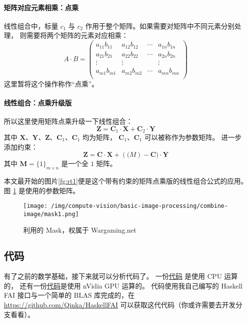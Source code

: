 \paragraph{矩阵对应元素相乘：点乘}
线性组合中，标量 $c_1$ 与 $c_2$ 作用于整个矩阵。如果需要对矩阵中不同元素分别处理，
则需要将两个矩阵的元素对应相乘：
\[
    A \cdot B = \left( \begin{array}{cccc}
        a_{11} b_{11} & a_{12} b_{12} & \cdots & a_{1n} b_{1n} \\
        a_{21} b_{21} & a_{22} b_{22} & \cdots & a_{2n} b_{2n} \\
        \vdots          & \vdots          &        & \vdots          \\
        a_{m1} b_{m1} & a_{m2} b_{m2} & \cdots & a_{mn} b_{mn} \\
    \end{array} \right)
\]
这里暂将这个操作称作“点乘”。

\paragraph{线性组合：点乘升级版}
所以这里使用矩阵点乘升级一下线性组合：
\[
    \mathbf{Z} = \mathbf{C}_1 \cdot \mathbf{X} + \mathbf{C}_2 \cdot \mathbf{Y}
\]
其中  $\mathbf{X}$、$\mathbf{Y}$、$\mathbf{Z}$、$\mathbf{C}_1$、$\mathbf{C}_1$ 均为矩阵，
$\mathbf{C}_1$、$\mathbf{C}_1$ 可以被称作为参数矩阵。
进一步添加约束：
\[
    \mathbf{Z} = \mathbf{C} \cdot \mathbf{X} + (\mathbf(M) - \mathbf{C}) \cdot \mathbf{Y}
\]
其中 $\mathbf{M} = \{1\}_{m \times n}$ 是一个全 $1$ 矩阵。

本文最开始的图片\ref{fg:rt1}便是这个带有约束的矩阵点乘版的线性组合公式的应用。
图 \ref{fg:mask} 是使用的参数矩阵。
\begin{figure}
    \centering
    \texttt{[image: /img/compute-vision/basic-image-processing/combine-image/mask1.png]}
    \label{fg:mask}
    \caption{利用的 Mask，权属于 Wargaming.net}
\end{figure}

\subsection{代码}
有了之前的数学基础，接下来就可以分析代码了。
一份\href{https://gist.github.com/Qinka/c118d6ab3e9f3d2a981ef6a1e84ac074}{代码} 是使用 CPU 运算的，
还有一份\href{https://gist.github.com/Qinka/d19cc950dc6b67e2e7a8d046bb9fa2cf}{代码}是使用 nVidia GPU 运算的。
代码使用我自己编写的 Haskell FAI 接口与一个简单的 BLAS 库完成的，在 \url{https://github.com/Qinka/HaskellFAI}
可以获取这代代码（你或许需要去开发分支看看）。

